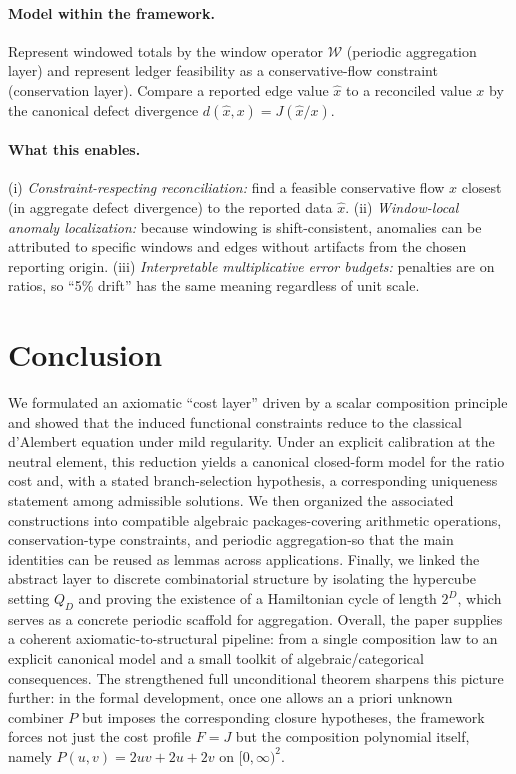 \documentclass[11pt,reqno]{amsart}
\theoremstyle{plain}
\theoremstyle{definition}
\theoremstyle{remark}
\newcommand{\Jcost}{J}
\newcommand{\1}{\mathbf{1}}
\newcommand{\paperadd}[1]{{\color{paperblue}#1}}
\begin{document}
\paragraph{\textbf{Model within the framework.}}
Represent windowed totals by the window operator $\mathcal W$ (periodic aggregation layer) and represent
ledger feasibility as a conservative-flow constraint (conservation layer).  Compare a reported edge value
$\widehat{x}$ to a reconciled value $x$ by the canonical defect divergence $d(\widehat{x},x)=\Jcost(\widehat{x}/x)$.

\paragraph{What this enables.}
(i) \emph{Constraint-respecting reconciliation:} find a feasible conservative flow $x$ closest (in aggregate
defect divergence) to the reported data $\widehat{x}$.
(ii) \emph{Window-local anomaly localization:} because windowing is shift-consistent, anomalies can be
attributed to specific windows and edges without artifacts from the chosen reporting origin.
(iii) \emph{Interpretable multiplicative error budgets:} penalties are on ratios, so “5\% drift” has the same
meaning regardless of unit scale.




\section*{Conclusion}
We formulated an axiomatic ``cost layer'' driven by a scalar composition principle and showed that the induced functional constraints reduce to the classical d'Alembert equation under mild regularity. Under an explicit calibration at the neutral element, this reduction yields a canonical closed-form model for the ratio cost and, with a stated branch-selection hypothesis, a corresponding uniqueness statement among admissible solutions. We then organized the associated constructions into compatible algebraic packages-covering arithmetic operations, conservation-type constraints, and periodic aggregation-so that the main identities can be reused as lemmas across applications. Finally, we linked the abstract layer to discrete combinatorial structure by isolating the hypercube setting $Q_D$ and proving the existence of a Hamiltonian cycle of length $2^D$, which serves as a concrete periodic scaffold for aggregation. Overall, the paper supplies a coherent axiomatic-to-structural pipeline: from a single composition law to an explicit canonical model and a small toolkit of algebraic/categorical consequences.
\paperadd{The strengthened full unconditional theorem sharpens this picture further: in the formal development, once one allows an a priori unknown combiner \(P\) but imposes the corresponding closure hypotheses, the framework forces not just the cost profile \(F=\Jcost\) but the composition polynomial itself, namely \(P(u,v)=2uv+2u+2v\) on \([0,\infty)^2\).}
\end{document}
